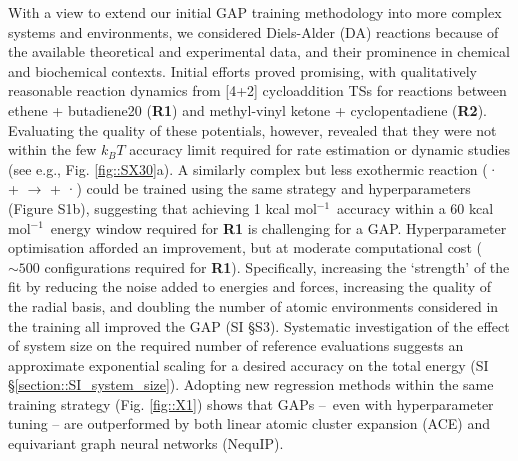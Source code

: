 \documentclass[twoside,twocolumn,9pt]{article}
\newcommand{\kcal}{kcal mol$^{-1}$}
\begin{document}
With a view to extend our initial GAP training methodology\cite{Young2021gap} into more complex systems and environments, we considered Diels-Alder (DA) reactions because of the available theoretical and experimental data,\cite{Black2012, Lording2020} and their prominence in chemical and biochemical contexts.\cite{Sato2021, MartCentelles2018, Briou2021} Initial efforts proved promising, with qualitatively reasonable reaction dynamics from [4+2] cycloaddition TSs for reactions between ethene + butadiene20 ({\bfseries{R1}}) and methyl-vinyl ketone + cyclopentadiene ({\bfseries{R2}}). Evaluating the quality of these potentials, however, revealed that they were not within the few $k_BT$ accuracy limit required for rate estimation or dynamic studies (see e.g., Fig. {\ref{fig::SX30}}a). A similarly complex but less exothermic reaction ({· +  $\rightarrow$  + ·}) could be trained using the same strategy and hyperparameters (Figure S1b), suggesting that achieving 1 \kcal~accuracy within a 60 \kcal~energy window required for {\bfseries{R1}} is challenging for a GAP. Hyperparameter optimisation afforded an improvement, but at moderate computational cost ($\sim500$ configurations required for {\bfseries{R1}}). Specifically, increasing the `strength’ of the fit by reducing the noise added to energies and forces, increasing the quality of the radial basis, and doubling the number of atomic environments considered in the training all improved the GAP (SI §S3). Systematic investigation of the effect of system size on the required number of reference evaluations suggests an approximate exponential scaling for a desired accuracy on the total energy (SI §\ref{section::SI_system_size}). Adopting new regression methods within the same training strategy (Fig. \ref{fig::X1}) shows that GAPs – even with hyperparameter tuning – are outperformed by both linear atomic cluster expansion (ACE\cite{Drautz2019}) and equivariant graph neural networks (NequIP\cite{Batzner2021}). 
\end{document}
